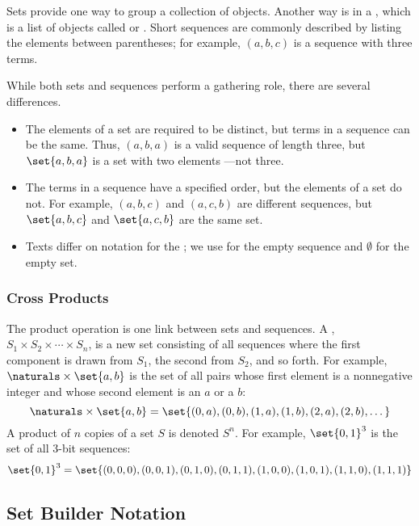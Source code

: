 Sets provide one way to group a collection of objects.  Another way is
in a , which is a list of objects called 
or .  Short sequences are commonly described by
listing the elements between parentheses; for example, $(a, b, c)$ is
a sequence with three terms.

While both sets and sequences perform a gathering role, there are
several differences.
\begin{itemize}

\item The elements of a set are required to be distinct, but terms in a
sequence can be the same.  Thus, $(a, b, a)$ is a valid sequence of length
three, but $\set{a, b, a}$ is a set with two elements ---not three.

\item The terms in a sequence have a specified order, but the elements
of a set do not.  For example, $(a, b, c)$ and $(a, c, b)$ are
different sequences, but $\set{a, b, c}$ and $\set{a, c, b}$ are the
same set.

\item Texts differ on notation for the ; we use
  \term{$\lambda$} for the empty sequence and $\emptyset$ for the
  empty set.
\end{itemize}

\subsubsection{Cross Products}

The product operation is one link between sets and sequences.  A
, $S_1 \times S_2 \times \cdots \times S_n$, is a
new set consisting of all sequences where the first component is drawn
from $S_1$, the second from $S_2$, and so forth.  For example, $\naturals
\times \set{a,b}$ is the set of all pairs whose first element is a
nonnegative integer and whose second element is an $a$ or a $b$:
\[
\naturals \times \set{a,b}
    = \set{(0,a), (0,b), (1,a), (1,b), (2,a), (2, b), \dots}
\]
A product of $n$ copies of a set $S$ is denoted $S^n$.  For example,
$\set{0, 1}^3$ is the set of all $3$-bit sequences:
\[
\set{0, 1}^3 = \set{ (0,0,0), (0,0,1), (0,1,0), (0,1,1),
                     (1,0,0), (1,0,1), (1,1,0), (1,1,1) }
\]

\subsection{Set Builder Notation}\label{sec:set_builder_notation}

